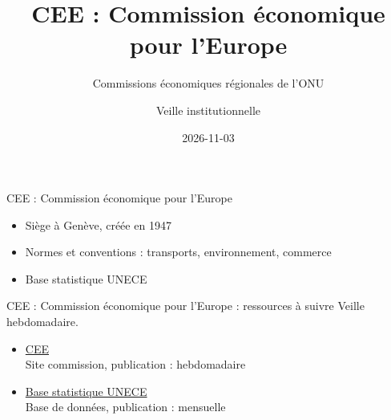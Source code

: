 \documentclass[aspectratio=169,11pt]{beamer}
\title{CEE : Commission économique pour l'Europe}
\subtitle{Commissions économiques régionales de l'ONU}
\author{Veille institutionnelle}
\date{2026-11-03}
\begin{document}
\begin{frame}\titlepage\end{frame}

\begin{frame}{CEE : Commission économique pour l'Europe}
\begin{itemize}
\item Siège à Genève, créée en 1947
\item Normes et conventions : transports, environnement, commerce
\item Base statistique UNECE
\end{itemize}
\end{frame}

\begin{frame}{CEE : Commission économique pour l'Europe : ressources à suivre}
\small
Veille hebdomadaire.
\begin{itemize}
\item \href{https://unece.org}{CEE}\\{\footnotesize Site commission, publication : hebdomadaire}
\item \href{https://w3.unece.org/PXWeb2015/pxweb/en/STAT}{Base statistique UNECE}\\{\footnotesize Base de données, publication : mensuelle}
\end{itemize}
\end{frame}
\end{document}
